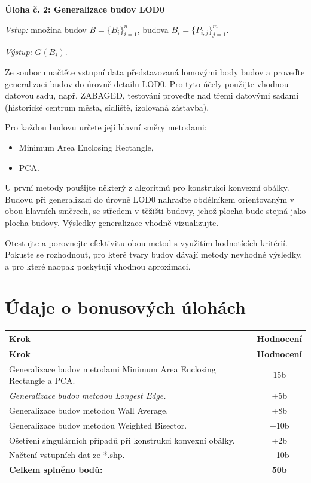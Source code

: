 \documentclass[a4paper,12pt]{article}
\begin{document}
\textbf{Úloha č. 2: Generalizace budov LOD0}

\textit{Vstup:} množina budov $B = \{B_i\}_{i=1}^{n}$, \quad budova $B_i = \{P_{i,j}\}_{j=1}^{m}$.

\textit{Výstup:} $G(B_i)$.

Ze souboru načtěte vstupní data představovaná lomovými body budov a proveďte generalizaci budov do úrovně detailu LOD0. Pro tyto účely použijte vhodnou datovou sadu, např. ZABAGED, testování proveďte nad třemi datovými sadami (historické centrum města, sídliště, izolovaná zástavba).

Pro každou budovu určete její hlavní směry metodami:

\begin{itemize}
    \item Minimum Area Enclosing Rectangle,
    \item PCA.
\end{itemize}

U první metody použijte některý z algoritmů pro konstrukci konvexní obálky. Budovu při generalizaci do úrovně LOD0 nahraďte obdélníkem orientovaným v obou hlavních směrech, se středem v těžišti budovy, jehož plocha bude stejná jako plocha budovy. Výsledky generalizace vhodně vizualizujte.

Otestujte a porovnejte efektivitu obou metod s využitím hodnotících kritérií. Pokuste se rozhodnout, pro které tvary budov dávají metody nevhodné výsledky, a pro které naopak poskytují vhodnou aproximaci.

\section{Údaje o bonusových úlohách}

\begin{small}
\begin{longtable}{|p{12cm}|c|}
    \hline
    \textbf{Krok} & \textbf{Hodnocení} \\
    \hline
    \endfirsthead

    \hline
    \textbf{Krok} & \textbf{Hodnocení} \\
    \hline
    \endhead

    Generalizace budov metodami Minimum Area Enclosing Rectangle a PCA. & 15b \\
    \hline
    \textit{Generalizace budov metodou Longest Edge.} & +5b \\
    \hline
    Generalizace budov metodou Wall Average. & +8b \\
    \hline
    Generalizace budov metodou Weighted Bisector. & +10b \\
    \hline
    Ošetření singulárních případů při konstrukci konvexní obálky. & +2b \\
    \hline
    Načtení vstupních dat ze *.shp. & +10b \\
    \hline
    \textbf{Celkem splněno bodů:} & \textbf{50b} \\
    \hline
\end{longtable}
\end{small}
\end{document}
